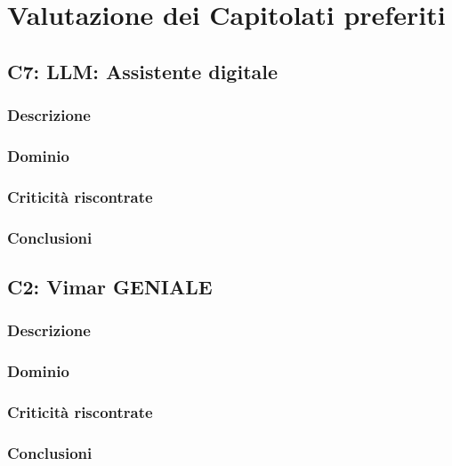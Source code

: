 \section{Valutazione dei Capitolati preferiti}


\subsection{C7: LLM: Assistente digitale}

\subsubsection{Descrizione}

\subsubsection{Dominio}

\subsubsection{Criticità riscontrate}

\subsubsection{Conclusioni}


\subsection{C2: Vimar GENIALE}

\subsubsection{Descrizione}

\subsubsection{Dominio}

\subsubsection{Criticità riscontrate}

\subsubsection{Conclusioni}